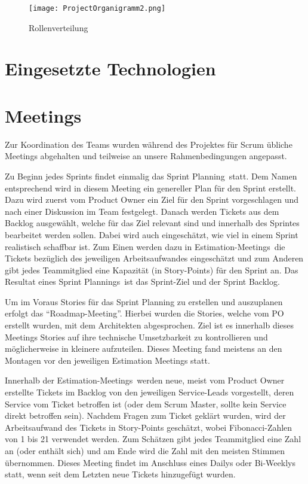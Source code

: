     \begin{figure}[!hbt]
        \texttt{[image: ProjectOrganigramm2.png]}
        \caption{Rollenverteilung}
        \label{fig:Rollenverteilung}
    \end{figure}
    
\section{Eingesetzte Technologien}

\section{Meetings}
    Zur Koordination des Teams wurden während des Projektes für Scrum übliche Meetings abgehalten und teilweise an unsere Rahmenbedingungen angepasst.

    Zu Beginn jedes Sprints findet einmalig das \glqq Sprint Planning\grqq~statt. Dem Namen entsprechend wird in diesem Meeting ein genereller Plan 
    für den Sprint erstellt. Dazu wird zuerst vom Product Owner ein Ziel für den Sprint vorgeschlagen und nach einer Diskussion im Team festgelegt.
    Danach werden Tickets aus dem Backlog ausgewählt, welche für das Ziel relevant sind und innerhalb des Sprintes bearbeitet werden sollen. Dabei 
    wird auch eingeschätzt, wie viel in einem Sprint realistisch schaffbar ist. Zum Einen werden dazu in \glqq Estimation-Meetings\grqq~die Tickets
    bezüglich des jeweiligen Arbeitsaufwandes eingeschätzt und zum Anderen gibt jedes Teammitglied eine Kapazität (in Story-Points) für den Sprint an.
    Das Resultat eines \glqq Sprint Plannings\grqq~ist das Sprint-Ziel und der Sprint Backlog.

    Um im Voraus Stories für das Sprint Planning zu erstellen und auszuplanen erfolgt das \enquote{Roadmap-Meeting}.
    Hierbei wurden die Stories, welche vom PO erstellt wurden, mit dem Architekten abgesprochen.
    Ziel ist es innerhalb dieses Meetings Stories auf ihre technische Umsetzbarkeit zu kontrollieren und möglicherweise in kleinere aufzuteilen.
    Dieses Meeting fand meistens an den Montagen vor den jeweiligen Estimation Meetings statt.

    Innerhalb der \glqq Estimation-Meetings\grqq~werden neue, meist vom Product Owner erstellte Tickets im Backlog von den jeweiligen Service-Leads
    vorgestellt, deren Service vom Ticket betroffen ist (oder dem Scrum Master, sollte kein Service direkt betroffen sein). Nachdem Fragen zum Ticket
    geklärt wurden, wird der Arbeitsaufwand des Tickets in Story-Points geschätzt, wobei Fibonacci-Zahlen von 1 bis 21 verwendet werden. Zum Schätzen
    gibt jedes Teammitglied eine Zahl an (oder enthält sich) und am Ende wird die Zahl mit den meisten Stimmen übernommen. 
    Dieses Meeting findet im Anschluss eines Dailys oder Bi-Weeklys statt, wenn seit dem Letzten neue Tickets hinzugefügt wurden.

